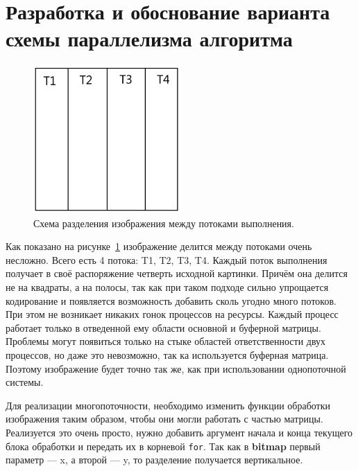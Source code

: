 \newpage


\section{Разработка и обоснование варианта схемы параллелизма алгоритма}\label{sec:devAlgoParallel}
\begin{figure}[h]
    \begin{center}
        \includegraphics[width=0.5\textwidth]{resources/img}
    \end{center}
    \caption{Схема разделения изображения между потоками выполнения.}
    \label{fig:imageThreads}
\end{figure}

Как показано на рисунке~\ref{fig:imageThreads} изображение делится между потоками очень несложно.
Всего есть 4 потока: T1, T2, T3, T4.
Каждый поток выполнения получает в своё распоряжение четверть исходной картинки.
Причём она делится не на квадраты, а на полосы, так как при таком подходе сильно упрощается кодирование и появляется возможность добавить сколь угодно много потоков.
При этом не возникает никаких гонок процессов на ресурсы.
Каждый процесс работает только в отведенной ему области основной и буферной матрицы.
Проблемы могут появиться только на стыке областей ответственности двух процессов, но даже это невозможно, так ка используется буферная матрица.
Поэтому изображение будет точно так же, как при использовании однопоточной системы.

Для реализации многопоточности, необходимо изменить функции обработки изображения таким образом, чтобы они могли работать с частью матрицы.
Реализуется это очень просто, нужно добавить аргумент начала и конца текущего блока обработки и передать их в корневой \texttt{for}.
Так как в \textbf{bitmap} первый параметр --- x, а второй --- y, то разделение получается вертикальное.
